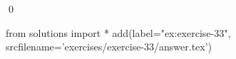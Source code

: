
\begin{ex} 
  \label{ex:exercise-33}
  
  \qed
\end{ex} 
\begin{python0}
from solutions import *
add(label="ex:exercise-33",
    srcfilename='exercises/exercise-33/answer.tex') 
\end{python0}
